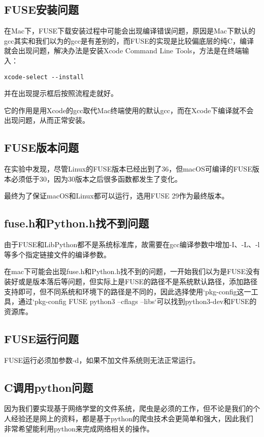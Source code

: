 \subsection{FUSE安装问题}

在Mac下，FUSE下载安装过程中可能会出现编译错误问题，原因是Mac下默认的gcc其实和我们以为的gcc是有差别的，而FUSE的实现是比较偏底层的纯C，编译就会出现问题，解决办法是安装Xcode Command Line Tools，方法是在终端输入：

\begin{lstlisting}
xcode-select --install
\end{lstlisting}
并在出现提示框后按照流程走就好。

它的作用是用Xcode的gcc取代Mac终端使用的默认gcc，而在Xcode下编译就不会出现问题，从而正常安装。

\subsection{FUSE版本问题}

在实验中发现，尽管Linux的FUSE版本已经出到了36，但macOS可编译的FUSE版本必须低于30，因为30版本之后很多函数都发生了变化。

最终为了保证macOS和Linux都可以运行，选用FUSE 29作为最终版本。

\subsection{fuse.h和Python.h找不到问题}

由于FUSE和LibPython都不是系统标准库，故需要在gcc编译参数中增加-I、-L、-l等多个指定链接文件的编译参数。

在mac下可能会出现fuse.h和Python.h找不到的问题，一开始我们以为是FUSE没有装好或是版本落后等问题，但实际上是FUSE的路径不是系统默认路径，添加路径支持即可，但不同系统和环境下的路径是不同的，因此选择使用`pkg-config这一工具，通过`pkg-config FUSE python3 --cflags --libs`可以找到python3-dev和FUSE的资源库。

\subsection{FUSE运行问题}

FUSE运行必须加参数-d，如果不加文件系统则无法正常运行。

\subsection{C调用python问题}

因为我们要实现基于网络学堂的文件系统，爬虫是必须的工作，但不论是我们的个人经验还是网上的资料，都是基于python的爬虫技术会更简单和强大，因此我们非常希望能利用python来完成网络相关的操作。

